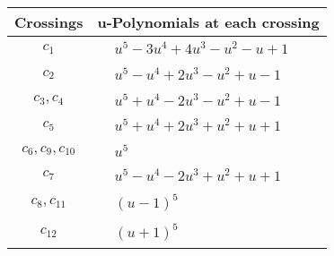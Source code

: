 \documentclass[1p]{elsarticle_modified}
\theoremstyle{definition}
\begin{document}
\begin{tabular}{m{50pt}|m{274pt}}
Crossings & \hspace{64pt}u-Polynomials at each crossing \\
\hline $$\begin{aligned}c_{1}\end{aligned}$$&$\begin{aligned}
&u^5-3 u^4+4 u^3- u^2- u+1
\end{aligned}$\\
\hline $$\begin{aligned}c_{2}\end{aligned}$$&$\begin{aligned}
&u^5- u^4+2 u^3- u^2+u-1
\end{aligned}$\\
\hline $$\begin{aligned}c_{3},c_{4}\end{aligned}$$&$\begin{aligned}
&u^5+u^4-2 u^3- u^2+u-1
\end{aligned}$\\
\hline $$\begin{aligned}c_{5}\end{aligned}$$&$\begin{aligned}
&u^5+u^4+2 u^3+u^2+u+1
\end{aligned}$\\
\hline $$\begin{aligned}c_{6},c_{9},c_{10}\end{aligned}$$&$\begin{aligned}
&u^5
\end{aligned}$\\
\hline $$\begin{aligned}c_{7}\end{aligned}$$&$\begin{aligned}
&u^5- u^4-2 u^3+u^2+u+1
\end{aligned}$\\
\hline $$\begin{aligned}c_{8},c_{11}\end{aligned}$$&$\begin{aligned}
&(u-1)^5
\end{aligned}$\\
\hline $$\begin{aligned}c_{12}\end{aligned}$$&$\begin{aligned}
&(u+1)^5
\end{aligned}$\\
\hline
\end{tabular}\\~\\
\end{document}
